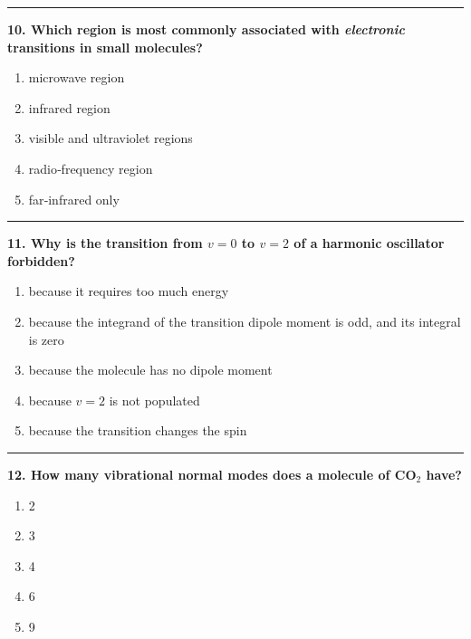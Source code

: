 \documentclass[
  english,
  9pt,
]{extbook}
\providecommand{\tightlist}{%
  \setlength{\itemsep}{0pt}\setlength{\parskip}{0pt}}
\theoremstyle{definition}
\theoremstyle{definition}
\theoremstyle{definition}
\theoremstyle{definition}
\theoremstyle{remark}
\begin{document}
\begin{center}\rule{0.5\linewidth}{0.5pt}\end{center}

\textbf{10. Which region is most commonly associated with \emph{electronic} transitions in small molecules?}

\begin{enumerate}
\def\labelenumi{\alph{enumi}.}
\tightlist
\item
  microwave region
\item
  infrared region
\item
  visible and ultraviolet regions
\item
  radio‑frequency region
\item
  far‑infrared only
\end{enumerate}

\begin{center}\rule{0.5\linewidth}{0.5pt}\end{center}

\textbf{11. Why is the transition from \(v=0\) to \(v=2\) of a harmonic oscillator forbidden?}

\begin{enumerate}
\def\labelenumi{\alph{enumi}.}
\tightlist
\item
  because it requires too much energy\\
\item
  because the integrand of the transition dipole moment is odd, and its integral is zero\\
\item
  because the molecule has no dipole moment\\
\item
  because \(v=2\) is not populated\\
\item
  because the transition changes the spin
\end{enumerate}

\begin{center}\rule{0.5\linewidth}{0.5pt}\end{center}

\textbf{12. How many vibrational normal modes does a molecule of CO\(_2\) have?}

\begin{enumerate}
\def\labelenumi{\alph{enumi}.}
\tightlist
\item
  2\\
\item
  3\\
\item
  4\\
\item
  6\\
\item
  9
\end{enumerate}
\end{document}

